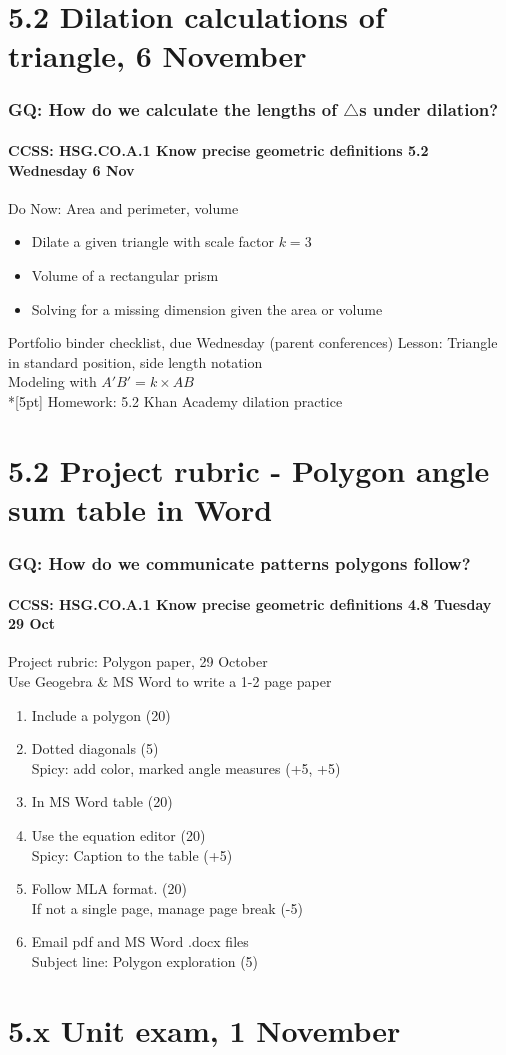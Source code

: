 \documentclass{beamer}
\begin{document}
  \section{5.2 Dilation calculations of triangle, 6 November}
  \frame
  {
    \frametitle{GQ: How do we calculate the lengths of $\triangle$s under dilation?}
    \framesubtitle{CCSS: HSG.CO.A.1 Know precise geometric definitions \hfill \alert{5.2 Wednesday 6 Nov}}
  
    \begin{block}{Do Now: Area and perimeter, volume}
    \begin{itemize}
      \item Dilate a given triangle with scale factor $k=3$
      \item Volume of a rectangular prism
      \item Solving for a missing dimension given the area or volume
    \end{itemize}
    \end{block}
    Portfolio binder checklist, due Wednesday (parent conferences)
    Lesson: Triangle in standard position, side length notation \\
    Modeling with $A'B'=k \times AB$ \\*[5pt]
    Homework: 5.2 Khan Academy dilation practice
  }


\section{5.2 Project rubric - Polygon angle sum table in Word}
\frame
{
\frametitle{GQ: How do we communicate patterns polygons follow?}
\framesubtitle{CCSS: HSG.CO.A.1 Know precise geometric definitions \hfill \alert{4.8 Tuesday 29 Oct}}

\begin{block}{Project rubric: Polygon paper, 29 October\\ Use Geogebra \& MS Word to write a 1-2 page paper}
\begin{enumerate} 
  \item Include a polygon (20)
  \item Dotted diagonals (5)\\
  Spicy: add color, marked angle measures (+5, +5)
  \item In MS Word table (20) 
  \item Use the equation editor (20) \\
  Spicy: Caption to the table (+5)
  \item Follow MLA format. (20) \\
  If not a single page, manage page break (-5)
  \item Email pdf and MS Word .docx files\\
  Subject line: Polygon exploration (5) 
\end{enumerate}
\end{block}
}


\section{5.x Unit exam, 1 November}
\end{document}
